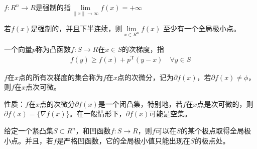         \begin{definition}[强制]
        $f:R^n\to R$是强制的指$\mathop{\lim}\limits_{\|x\|\to \infty}f(x)=+\infty$
        \end{definition}
        \begin{theorem}
        若$f(x)$是强制的，并且下半连续，则$\mathop{\lim}\limits_{x\in R^n}f(x)$
        至少有一个全局极小点。
        \end{theorem}
        \begin{definition}[次梯度]
        一个向量$p$称为凸函数$f:S\to R$在$x\in S$的次梯度，指
        \begin{align*}
        f(y)\geqslant f(x)+p^\mathrm{T} (y-x)\quad \forall y\in S
        \end{align*}
        \end{definition}
        \begin{definition}[次微分]
        $f$在$x$点的所有次梯度的集合称为$f$在$x$点的次微分，记为$\partial f(x)$，若$\partial f(x)\neq \phi$，则$f$在$x$点次可微。
        \end{definition}
        \par
        性质：$f$在$x$点的次微分$\partial f(x)$是一个闭凸集，特别地，若$f$在$x$点是次可微的，则$\partial f(x)=\{\nabla f(x)\}$。在一般情形下，$\partial f(x)$可能是空集。
        \par
        给定一个紧凸集$S\subset R^n$，和凹函数$f:S\to R$，则$f$可以在$S$的某个极点取得全局极小点。并且，若$f$是严格凹函数，它的全局极小值只能出现在$S$的极点处。
